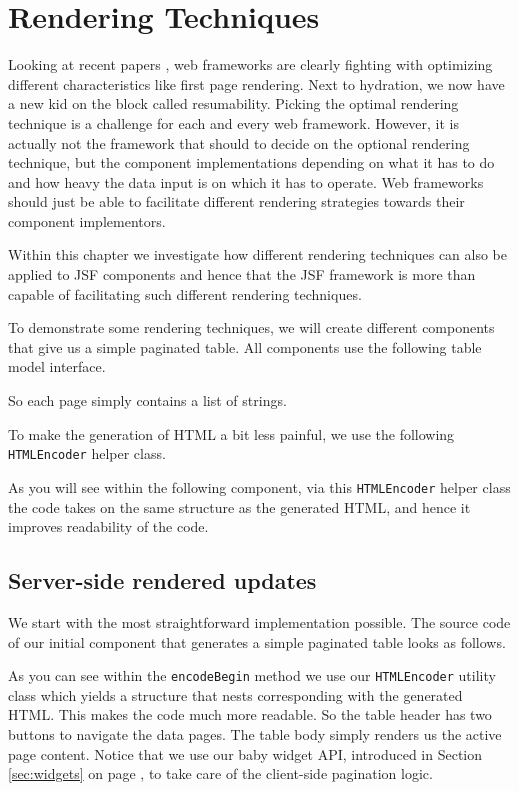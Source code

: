 %

\chapter{Rendering Techniques}

Looking at recent papers \cite{Resumability2024},  web frameworks are clearly fighting with optimizing different characteristics like first page rendering.
Next to hydration, we now have a new kid on the block called resumability.
Picking the optimal rendering technique is a challenge for each and every web framework.
However, it is actually not the framework that should to decide on the optional rendering technique, but the component implementations depending on what it has to do and how heavy the data input is on which it has to operate.
Web frameworks should just be able to facilitate different rendering strategies towards their component implementors.

Within this chapter we investigate how different rendering techniques can also be applied to JSF components and hence that the JSF framework is more than capable of facilitating such different rendering techniques.

To demonstrate some rendering techniques, we will create different components that give us a simple paginated table.
All components use the following table model interface.

So each page simply contains a list of strings.

To make the generation of HTML a bit less painful, we use the following \texttt{HTMLEncoder} helper class.

As you will see within the following component, via this \texttt{HTMLEncoder} helper class the code takes on the same structure as the generated HTML, and hence it improves readability of the code.

\section{Server-side rendered updates}
We start with the most straightforward implementation possible.
The source code of our initial component that generates a simple paginated table looks as follows.

As you can see within the \texttt{encodeBegin} method we use our \texttt{HTMLEncoder} utility class which yields a structure that nests corresponding with the generated HTML.
This makes the code much more readable.
So the table header has two buttons to navigate the data pages.
The table body simply renders us the active page content.
Notice that we use our baby widget API, introduced in Section \ref{sec:widgets} on page \pageref{sec:widgets}, to take care of the client-side pagination logic.

